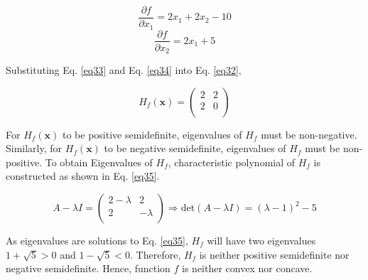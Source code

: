 \begin{equation}
\frac{\partial f}{\partial x_1} = 2x_1 + 2x_2 - 10
\label{eq33}
\end{equation}
\begin{equation}
\frac{\partial f}{\partial x_2} = 2x_1 + 5
\label{eq34}
\end{equation}

Substituting Eq. \ref{eq33} and Eq. \ref{eq34} into Eq. \ref{eq32},

\begin{equation}
H_f(\mathbf{x}) = \begin{pmatrix}2 & 2\\2 & 0\\\end{pmatrix}
\end{equation}

For $H_f(\mathbf{x})$ to be positive semidefinite, eigenvalues of $H_f$ must be non-negative.
Similarly, for $H_f(\mathbf{x})$ to be negative semidefinite, eigenvalues of $H_f$ must be non-positive.
To obtain Eigenvalues of $H_f$, characteristic polynomial of $H_f$ is constructed as shown in Eq. \ref{eq35}.

\begin{equation}
A-\lambda I = \begin{pmatrix}2-\lambda & 2\\ 2 & -\lambda\\\end{pmatrix}\Rightarrow \text{det}(A-\lambda I) = (\lambda - 1)^2 -5
\label{eq35}
\end{equation}

As eigenvalues are solutions to Eq. \ref{eq35}, $H_f$ will have two eigenvalues $1+\sqrt{5} > 0$ and $1-\sqrt{5} < 0$.
Therefore, $H_f$ is neither positive semidefinite nor negative semidefinite.
Hence, function $f$ is neither convex nor concave.
